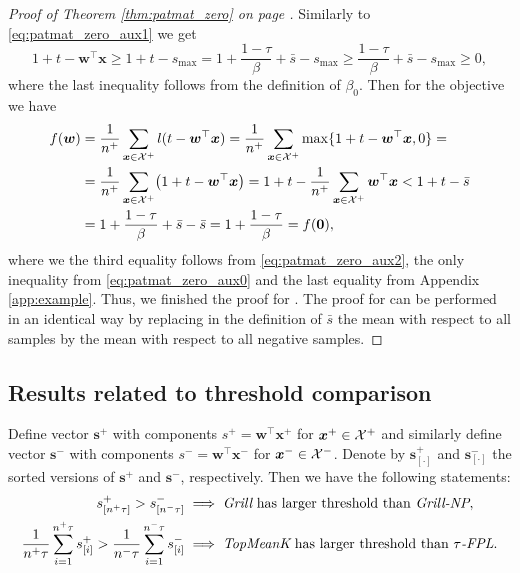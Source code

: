 \begin{proof}[Proof of Theorem \ref{thm:patmat_zero} on page \pageref{thm:patmat_zero}]
  Similarly to \eqref{eq:patmat_zero_aux1} we get
  \begin{equation}\label{eq:patmat_zero_aux2}
    1 + t - \bm{w}^\top \bm{x}
    \ge 1 + t-s_{\max}
    =   1 + \frac{1-\tau}{\beta} + \bar{s} - s_{\max}
    \ge \frac{1-\tau}{\beta} + \bar{s} - s_{\max}
    \ge 0,
  \end{equation}
  where the last inequality follows from the definition of $\beta_0$. Then for the objective we have
  \begin{equation*}
    \begin{aligned}
      f(\bm{w})
      & = \frac{1}{n^+}\sum_{\bm{x} \in \Xc^+}l(t-\bm{w}^\top \bm{x})
        = \frac{1}{n^+}\sum_{\bm{x} \in \Xc^+}\max\{1+t-\bm{w}^\top \bm{x}, 0\} = \\
      & = \frac{1}{n^+}\sum_{\bm{x} \in \Xc^+}\Brac{1+t-\bm{w}^\top \bm{x}}
        = 1 + t - \frac{1}{n^+}\sum_{\bm{x} \in \Xc^+}\bm{w}^\top \bm{x}
        < 1 + t - \bar{s} \\
      & = 1 + \frac{1-\tau}{\beta} + \bar{s} -\bar{s}
        = 1 + \frac{1-\tau}{\beta}
        = f(\bm{0}),\\
    \end{aligned}
  \end{equation*}
  where we the third equality follows from \eqref{eq:patmat_zero_aux2}, the only inequality from \eqref{eq:patmat_zero_aux0} and the last equality from Appendix \ref{app:example}. Thus, we finished the proof for \PatMat. The proof for \PatMatNP can be performed in an identical way by replacing in the definition of $\bar{s}$ the mean with respect to all samples by the mean with respect to all negative samples.
\end{proof}

\subsection{Results related to threshold comparison}\label{app:relations}

\begin{lemma}\label{lemma:thresholds2}
  Define vector $\bm{s}^+$ with components $s^+=\bm{w}^\top \bm{x}^+$ for $\bm{x}^+\in\mathcal{X}^+$ and similarly define vector $\bm{s}^-$ with components $s^-=\bm{w}^\top \bm{x}^-$ for $\bm{x}^-\in\mathcal{X}^-$. Denote by $\bm{s}_{[\cdot]}^+$ and $\bm{s}_{[\cdot]}^-$ the sorted versions of $\bm{s}^+$ and $\bm{s}^-$, respectively. Then we have the following statements:
  \begin{equation*}
    \begin{aligned}
      s_{[n^+\tau]}^+ > s_{[n^-\tau]}^-
      & \implies \emph{Grill} \text{ has larger threshold than }\emph{Grill-NP}, \\
      \frac{1}{n^+\tau}\sum_{i=1}^{n^+\tau} s_{[i]}^+
      > \frac{1}{n^-\tau}\sum_{i=1}^{n^-\tau} s_{[i]}^-
      & \implies \emph{TopMeanK} \text{ has larger threshold than }{\emph{$\tau$-FPL}}. \\
    \end{aligned}
  \end{equation*}
\end{lemma}

